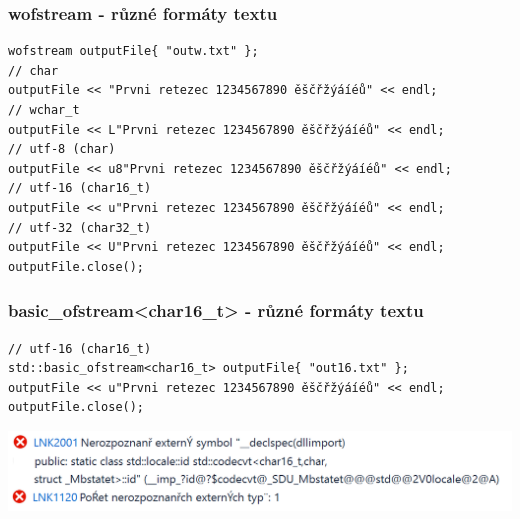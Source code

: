 \begin{frame}[fragile]
\frametitle{wofstream - různé formáty textu}
\begin{yesblock}
\begin{lstlisting}
wofstream outputFile{ "outw.txt" };
// char
outputFile << "Prvni retezec 1234567890 ěščřžýáíéů" << endl;
// wchar_t
outputFile << L"Prvni retezec 1234567890 ěščřžýáíéů" << endl;
// utf-8 (char)
outputFile << u8"Prvni retezec 1234567890 ěščřžýáíéů" << endl;
// utf-16 (char16_t)
outputFile << u"Prvni retezec 1234567890 ěščřžýáíéů" << endl;
// utf-32 (char32_t)
outputFile << U"Prvni retezec 1234567890 ěščřžýáíéů" << endl;
outputFile.close();
\end{lstlisting}
\end{yesblock}
\end{frame}





\begin{frame}[fragile]
\frametitle{basic\_ofstream<char16\_t> - různé formáty textu}
\begin{yesblock}
\begin{lstlisting}
// utf-16 (char16_t)
std::basic_ofstream<char16_t> outputFile{ "out16.txt" };
outputFile << u"Prvni retezec 1234567890 ěščřžýáíéů" << endl;
outputFile.close();
\end{lstlisting}
\end{yesblock}
\end{frame}


\begin{frame}[fragile]
\includegraphics[width=\textwidth]{img/datastreams-char16terror.png}
\end{frame}

